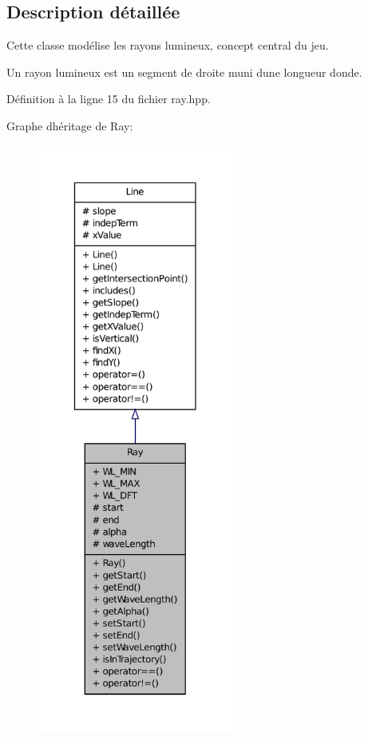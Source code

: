 \subsection{Description détaillée}
Cette classe modélise les rayons lumineux, concept central du jeu. 

Un rayon lumineux est un segment de droite muni d\textquotesingle{}une longueur d\textquotesingle{}onde. 

Définition à la ligne 15 du fichier ray.\+hpp.



Graphe d\textquotesingle{}héritage de Ray\+:\nopagebreak
\begin{figure}[H]
\begin{center}
\leavevmode
\includegraphics[height=550pt]{da/db5/classRay__inherit__graph}
\end{center}
\end{figure}


